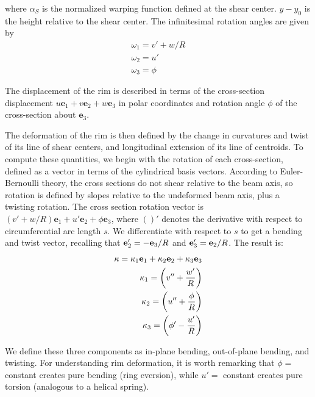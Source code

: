 \documentclass[\rootdir/thesis.tex]{subfiles}
\begin{document}
where $\alpha_S$ is the normalized warping function defined at the shear center. $y-y_0$ is the height relative to the shear center. The infinitesimal rotation angles are given by
\begin{subequations}
\label{eq:omega}
\begin{align}
\omega_1 = v' + w/R\\
\omega_2 = u'\\
\omega_3 = \phi
\end{align}
\end{subequations}



The displacement of the rim is described in terms of the cross-section displacement $u\mathbf{e}_1 + v\mathbf{e}_2 + w\mathbf{e}_3$ in polar coordinates and rotation angle $\phi$ of the cross-section about $\mathbf{e}_3$.

The deformation of the rim is then defined by the change in curvatures and twist of its line of shear centers, and longitudinal extension of its line of centroids. To compute these quantities, we begin with the rotation of each cross-section, defined as a vector in terms of the cylindrical basis vectors. According to Euler-Bernoulli theory, the cross sections do not shear relative to the beam axis, so rotation is defined by slopes relative to the undeformed beam axis, plus a twisting rotation. The cross section rotation vector is $(v' + w/R) \mathbf{e}_1 + u' \mathbf{e}_2 + \phi\mathbf{e}_3$, where $()'$ denotes the derivative with respect to circumferential arc length $s$. We differentiate with respect to $s$ to get a bending and twist vector, recalling that $\mathbf{e}_2' = -\mathbf{e}_3/R$ and $\mathbf{e}_3' = \mathbf{e}_2/R$. The result is:
\begin{subequations}
\label{eq:kappa}
\begin{align}
\mathbf{\kappa} = \kappa_1\mathbf{e}_1 + \kappa_2\mathbf{e}_2 + \kappa_3\mathbf{e}_3\\
\kappa_1 = \left( v'' + \frac{w'}{R} \right) \label{eq:kappa1}\\
\kappa_2 = \left( u'' + \frac{\phi}{R} \right) \label{eq:kappa2}\\
\kappa_3 = \left( \phi' - \frac{u'}{R} \right) \label{eq:kappa3}
\end{align}
\end{subequations}

We define these three components as in-plane bending, out-of-plane bending, and twisting. For understanding rim deformation, it is worth remarking that $\phi=$ constant creates pure bending (ring eversion), while $u'=$ constant creates pure torsion (analogous to a helical spring).
\end{document}
